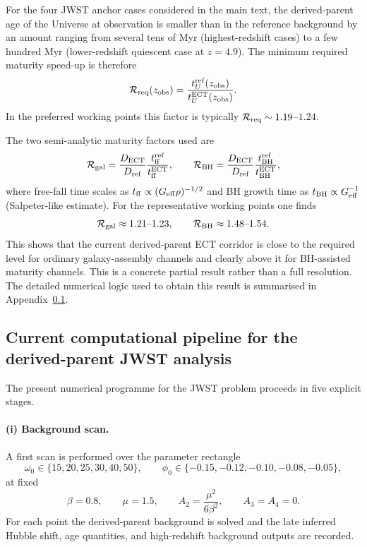 \documentclass[11pt,a4paper]{article}
\numberwithin{equation}{section}
\begin{document}
For the four JWST anchor cases considered in the main text, the
derived-parent age of the Universe at observation is smaller than in
the reference background by an amount ranging from several tens of Myr
(highest-redshift cases) to a few hundred Myr (lower-redshift quiescent
case at $z=4.9$).
The minimum required maturity speed-up is therefore
\[
\mathcal R_{\rm req}(z_{\rm obs})
=
\frac{t_U^{\rm ref}(z_{\rm obs})}{t_U^{\rm ECT}(z_{\rm obs})}.
\]
In the preferred working points this factor is typically
$\mathcal R_{\rm req}\sim 1.19$--$1.24$.

The two semi-analytic maturity factors used are
\[
\mathcal R_{\rm gal}
=
\frac{D_{\rm ECT}}{D_{\rm ref}}
\frac{t_{\rm ff}^{\rm ref}}{t_{\rm ff}^{\rm ECT}},
\qquad
\mathcal R_{\rm BH}
=
\frac{D_{\rm ECT}}{D_{\rm ref}}
\frac{t_{\rm BH}^{\rm ref}}{t_{\rm BH}^{\rm ECT}},
\]
where free-fall time scales as
$t_{\rm ff}\propto (G_{\rm eff}\rho)^{-1/2}$
and BH growth time as
$t_{\rm BH}\propto G_{\rm eff}^{-1}$ (Salpeter-like estimate).
For the representative working points one finds
\[
\mathcal R_{\rm gal}\approx 1.21\text{--}1.23,
\qquad
\mathcal R_{\rm BH}\approx 1.48\text{--}1.54.
\]
This shows that the current derived-parent ECT corridor is close to
the required level for ordinary galaxy-assembly channels and clearly
above it for BH-assisted maturity channels.
This is a concrete partial result rather than a full resolution.
The detailed numerical logic used to obtain this result is summarised in
Appendix~\ref{sec:derived_parent_pipeline}.

\subsection{Current computational pipeline for the derived-parent JWST analysis}
\label{sec:derived_parent_pipeline}

The present numerical programme for the JWST problem proceeds in five
explicit stages.

\paragraph{(i) Background scan.}
A first scan is performed over the parameter rectangle
\[
\omega_0\in\{15,20,25,30,40,50\},
\qquad
\phi_0\in\{-0.15,-0.12,-0.10,-0.08,-0.05\},
\]
at fixed
\[
\beta=0.8,\qquad
\mu=1.5,\qquad
A_2=\frac{\mu^2}{6\beta^2},\qquad
A_3=A_4=0.
\]
For each point the derived-parent background is solved and the late
inferred Hubble shift, age quantities, and high-redshift background
outputs are recorded.
\end{document}
